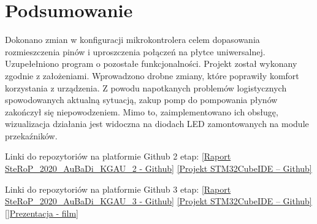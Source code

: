 \documentclass[10pt, a4paper]{article}
\begin{document}


\section{Podsumowanie}

Dokonano zmian w konfiguracji mikrokontrolera celem dopasowania rozmieszczenia pinów i uproszczenia połączeń na płytce uniwersalnej. Uzupełełniono program o pozostałe funkcjonalności.
Projekt został wykonany zgodnie z założeniami. Wprowadzono drobne zmiany, które poprawiły komfort korzystania z urządzenia. 
Z powodu napotkanych problemów logistycznych spowodowanych aktualną sytuacją, zakup pomp do pompowania płynów zakończył się niepowodzeniem. Mimo to, zaimplementowano ich obsługę, wizualizacja działania jest widoczna na diodach LED zamontowanych na module przekaźników.


\newpage
\newline
\newline
Linki do repozytoriów na platformie Github 2 etap:
\newline
\href{https://github.com/kewingaluszka/SteRoP_2020_AuBaDi_KGAU_2}{[Raport SteRoP\_2020\_AuBaDi\_KGAU\_2 - Github]}
\newline
\href{https://github.com/kewingaluszka/STM32_AuBaDi}{[Projekt STM32CubeIDE -- Github]}

Linki do repozytoriów na platformie Github 3 etap:
\newline
\href{https://github.com/kewingaluszka/SteRoP_2020_AuBaDi_KGAU_3}{[Raport SteRoP\_2020\_AuBaDi\_KGAU\_3 - Github]}
\newline
\href{https://github.com/kewingaluszka/AuBaDi}{[Projekt STM32CubeIDE -- Github]}
\newline
\href{www.youtube.com/watch?v=tgUb9r82Xmk}{[]Prezentacja - film]}
\end{document}
